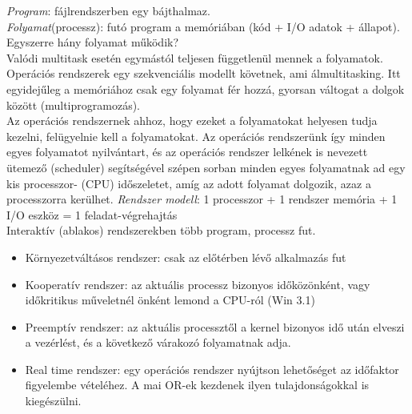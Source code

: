 \documentclass[margin=0px]{article}
\begin{document}
	\textit{Program}: fájlrendszerben egy bájthalmaz. \\
	\textit{Folyamat}(processz): futó program a memóriában (kód + I/O adatok + állapot). \\
	Egyszerre hány folyamat működik? \\
	Valódi multitask esetén egymástól teljesen függetlenül mennek a folyamatok. Operációs rendszerek egy szekvenciális modellt követnek, ami álmultitasking. Itt egyidejűleg a memóriához csak egy folyamat fér hozzá, gyorsan váltogat a dolgok között (multiprogramozás). \\
	Az operációs rendszernek ahhoz, hogy ezeket a folyamatokat helyesen tudja kezelni, felügyelnie kell a folyamatokat. Az operációs rendszerünk így minden egyes folyamatot nyilvántart, és az operációs rendszer lelkének is nevezett ütemező (scheduler) segítségével szépen sorban minden egyes folyamatnak ad egy kis processzor- (CPU) időszeletet, amíg az adott folyamat dolgozik, azaz a processzorra kerülhet.
	\textit{Rendszer modell}: 1 processzor + 1 rendszer memória + 1 I/O eszköz = 1 feladat-végrehajtás \\
	Interaktív (ablakos) rendszerekben több program, processz fut.
	\begin{itemize}
		\item Környezetváltásos rendszer: csak az előtérben lévő alkalmazás fut
		\item Kooperatív rendszer: az aktuális processz bizonyos időközönként, vagy időkritikus műveletnél önként lemond a CPU-ról (Win 3.1)
		\item Preemptív rendszer: az aktuális processztől a kernel bizonyos idő után elveszi a vezérlést, és a következő várakozó folyamatnak adja.
		\item Real time rendszer: egy operációs rendszer nyújtson lehetőséget az időfaktor figyelembe vételéhez. A mai OR-ek kezdenek ilyen tulajdonságokkal is kiegészülni.
	\end{itemize}
	
\end{document}
